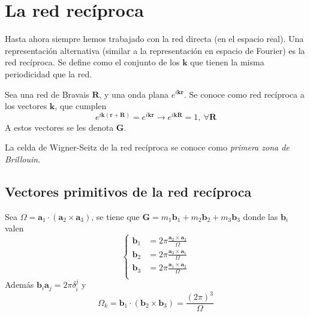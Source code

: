 \section{La red recíproca}
Hasta ahora siempre hemos trabajado con la red directa (en el espacio
real). Una representación alternativa (similar a la representación en
espacio de Fourier) es la red recíproca. Se define como el conjunto de
los $\mathbf{k}$ que tienen la misma periodicidad que la red.
\begin{definition}
  Sea una red de Bravais $\mathbf{R}$, y una onda plana
  $e ^{i\mathbf{k}\mathbf{r}}$. Se conoce como red recíproca a los
  vectores $\mathbf{k}$, que cumplen
  \begin{equation}
    e ^{i\mathbf{k}(\mathbf{r}+\mathbf{R})} = e ^{i\mathbf{k}\mathbf{r}} \rightarrow e ^{i\mathbf{k}\mathbf{R}}=1, \ \forall\mathbf{R}
  \end{equation}
  A estos vectores se les denota $\mathbf{G}$.
\end{definition}
La celda de Wigner-Seitz de la red recíproca se conoce como
\emph{primera zona de Brillouin}.

\subsection{Vectores primitivos de la red recíproca}
Sea $\Omega = \mathbf{a}_1 \cdot (\mathbf{a}_2 \times \mathbf{a}_3)$,
se tiene que $\mathbf{G} = m_1 \mathbf{b}_1 + m_2 \mathbf{b}_2 + m_3
\mathbf{b}_3$ donde las $\mathbf{b}_i$ valen
\begin{equation}
  \begin{cases}
    \mathbf{b}_1 &= 2\pi \frac{\mathbf{a}_2 \times \mathbf{a}_3}{\Omega} \\
    \mathbf{b}_2 &= 2\pi \frac{\mathbf{a}_3 \times \mathbf{a}_1}{\Omega} \\
    \mathbf{b}_3 &= 2\pi \frac{\mathbf{a}_1 \times \mathbf{a}_2}{\Omega} \\
  \end{cases}
\end{equation}
Además $\mathbf{b}_i \mathbf{a}_j = 2\pi \delta _i^j$ y 
\begin{equation}
  \Omega_k = \mathbf{b}_1 \cdot (\mathbf{b}_2 \times \mathbf{b}_3) = \frac{(2\pi)^3}{\Omega}
\end{equation}


